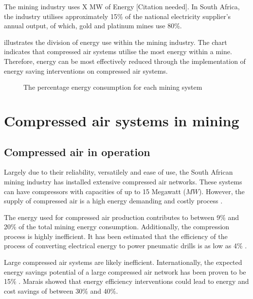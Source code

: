 			The mining industry uses X MW of Energy [Citation needed]. In South Africa, the industry utilises approximately 15\% of the national electricity supplier's annual output, of which, gold and platinum mines use 80\%\footnotemark[1].
			\par
			  illustrates the division of energy use within the mining industry. The chart indicates that compressed air systems utilise the most energy within a mine. Therefore, energy can be most effectively reduced through the implementation of energy saving interventions on compressed air systems.
			\begin{figure}[h]
				\centering
				\fbox{}
				\caption[The percentagee energy consumption for each mining system]{The percentage energy consumption for each mining system \cite{le2005energy}}
				\label{fig: Energy Split}
			\end{figure}
\section{Compressed air systems in mining}
	\subsection{Compressed air in operation}\label{key}
		Largely due to their reliability, versatilely and ease of use, the South African mining industry has installed extensive compressed air networks. These systems can have compressors with capacities of up to 15 Megawatt ($MW$)\cite{Marais2012PhD}. However, the supply of compressed air is a high energy demanding and costly process \cite{padachi2009energy}.
		\par 
		The energy used for compressed air production contributes to between 9\% and 20\% of the total mining energy consumption\footnotemark[1] \cite{du2011development}. Additionally, the compression process is highly inefficient. It has been estimated that the efficiency of the process of converting electrical energy to power pneumatic drills is as low as 4\% \cite{fraser2008saving}.
		\par
		Large compressed air systems are likely inefficient. Internationally, the expected energy savings potential of a large compressed air network has been proven to be 15\% \cite{neale2009compressed}. Marais \cite{marais2013simplification} showed that energy efficiency interventions could lead to energy and cost savings of between 30\% and 40\%. 
		
